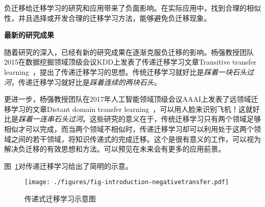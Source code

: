 负迁移给迁移学习的研究和应用带来了负面影响。在实际应用中，找到合理的相似性，并且选择或开发合理的迁移学习方法，能够避免负迁移现象。

\textbf{最新的研究成果}

随着研究的深入，已经有新的研究成果在逐渐克服负迁移的影响。杨强教授团队2015在数据挖掘领域顶级会议KDD上发表了传递迁移学习文章Transitive transfer learning~\cite{tan2015transitive}，提出了传递迁移学习的思想。传统迁移学习就好比是\textit{踩着一块石头过河}，传递迁移学习就好比是\textit{踩着连续的两块石头}。

更进一步，杨强教授团队在2017年人工智能领域顶级会议AAAI上发表了远领域迁移学习的文章Distant domain transfer learning~\cite{tan2017distant}，可以用人脸来识别飞机！这就好比是\textit{踩着一连串石头过河}。这些研究的意义在于，传统迁移学习只有两个领域足够相似才可以完成，而当两个领域不相似时，传递迁移学习却可以利用处于这两个领域之间的若干领域，将知识传递式的完成迁移。这个是很有意义的工作，可以视为解决负迁移的有效思想和方法。可以预见在未来会有更多的应用前景。

图~\ref{fig-negative}对传递迁移学习给出了简明的示意。

\begin{figure}[htbp]
	\centering
	\texttt{[image: ./figures/fig-introduction-negativetransfer.pdf]}
	\caption{传递式迁移学习示意图}
	\label{fig-negative}
\end{figure}

